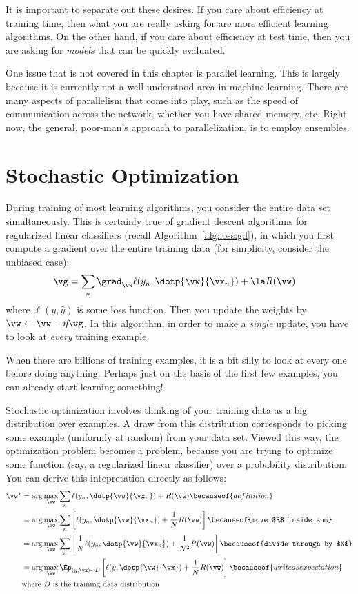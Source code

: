 It is important to separate out these desires.  If you care about
efficiency at training time, then what you are really asking for are
more efficient learning algorithms.  On the other hand, if you care
about efficiency at test time, then you are asking for \emph{models}
that can be quickly evaluated.

One issue that is not covered in this chapter is parallel learning.
This is largely because it is currently not a well-understood area in
machine learning.  There are many aspects of parallelism that come
into play, such as the speed of communication across the network,
whether you have shared memory, etc.  Right now, the general,
poor-man's approach to parallelization, is to employ ensembles.

\section{Stochastic Optimization}

During training of most learning algorithms, you consider the entire
data set simultaneously.  This is certainly true of gradient descent
algorithms for regularized linear classifiers (recall
Algorithm~\ref{alg:loss:gd}), in which you first compute a gradient
over the entire training data (for simplicity, consider the unbiased
case):
%
\begin{align}
\vg
&= \sum_n \grad_{\vw} \ell(y_n, \dotp{\vw}{\vx_n}) + \la R(\vw)
\end{align}
%
where $\ell(y,\hat y)$ is some loss function.  Then you update the
weights by $\vw \leftarrow \vw - \eta \vg$.  In this algorithm, in
order to make a \emph{single} update, you have to look at \emph{every}
training example.

When there are billions of training examples, it is a bit silly to
look at every one before doing anything.  Perhaps just on the basis of
the first few examples, you can already start learning something!

Stochastic optimization involves thinking of your training data as a
big distribution over examples.  A draw from this distribution
corresponds to picking some example (uniformly at random) from your
data set.  Viewed this way, the optimization problem becomes a
 problem, because you are trying to
optimize some function (say, a regularized linear classifier) over a
probability distribution.  You can derive this intepretation directly
as follows:
%
\begin{align}
\vw^*
&= \arg\max_{\vw} \sum_n \ell(y_n, \dotp{\vw}{\vx_n}) + R(\vw)
\becauseof{definition}\\
&= \arg\max_{\vw} \sum_n \left[ \ell(y_n, \dotp{\vw}{\vx_n}) + \frac 1 N R(\vw) \right]
\becauseof{move $R$ inside sum}\\
&= \arg\max_{\vw} \sum_n \left[ \frac 1 N \ell(y_n, \dotp{\vw}{\vx_n}) + \frac 1 {N^2} R(\vw) \right]
\becauseof{divide through by $N$}\\
&= \arg\max_{\vw} \Ep_{(y,\vx) \sim D} \left[ \ell(y, \dotp{\vw}{\vx}) + \frac 1 N R(\vw) \right]
\becauseof{write as expectation}\\
& \text{where } D \text{ is the training data distribution}
\end{align}
%

